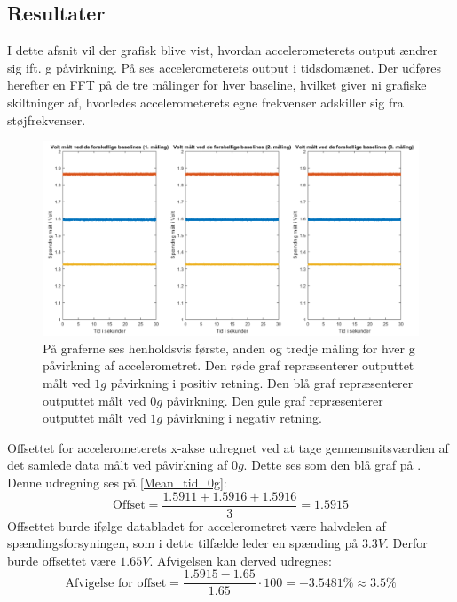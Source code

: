 \subsection{Resultater}\label{Sec_Pilot_Data}
I dette afsnit vil der grafisk blive vist, hvordan accelerometerets output ændrer sig ift. g påvirkning. På  ses accelerometerets output i tidsdomænet. Der udføres herefter en FFT på de tre målinger for hver baseline, hvilket giver ni grafiske skiltninger af, hvorledes accelerometerets egne frekvenser adskiller sig fra støjfrekvenser.

\begin{figure}[H]
	\centering
	\includegraphics[scale=0.45]{figures/cProblemloesning/Pilotforsoeg_Tid.png}
	\caption{På graferne ses henholdsvis første, anden og tredje måling for hver g påvirkning af accelerometret. Den røde graf repræsenterer outputtet målt ved $1g$ påvirkning i positiv retning. Den blå graf repræsenterer outputtet målt ved $0g$ påvirkning. Den gule graf repræsenterer outputtet målt ved $1g$ påvirkning i negativ retning.}
	\label{Fig:Pilot_Tid}
\end{figure}

Offsettet for accelerometerets x-akse udregnet ved at tage gennemsnitsværdien af det samlede data målt ved påvirkning af $0g$. Dette ses som den blå graf på . Denne udregning ses på \ref{Mean_tid_0g}:
\begin{equation}\label{Mean_tid_0g}
\text{Offset} = \frac{1.5911 + 1.5916 + 1.5916}{3} = 1.5915
\end{equation}
\noindent Offsettet burde ifølge databladet for accelerometret være halvdelen af spændingsforsyningen, som i dette tilfælde leder en spænding på $3.3V$. \cite{Devices2009} Derfor burde offsettet være $1.65V$. Afvigelsen kan derved udregnes:
\begin{equation}
\text{Afvigelse for offset} = \dfrac{1.5915 - 1.65}{1.65} \cdot 100 = -3.5481\% \approx 3.5\%
\end{equation}


